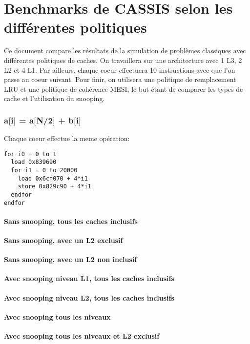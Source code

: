 \documentclass{article}
\begin{document}
\part*{Benchmarks de CASSIS selon les différentes politiques}
\indent Ce document compare les résultats de la simulation de problèmes classiques avec différentes politiques de caches. On travaillera sur une architecture avec 1 L3, 2 L2 et 4 L1. Par ailleurs, chaque coeur effectuera 10 instructions avec que l'on passe au coeur suivant. Pour finir, on utilisera une politique de remplacement LRU et une politique de cohérence MESI, le but étant de comparer les types de cache et l'utilisation du snooping.

\section{a[i] = a[N/2] + b[i]}
\indent Chaque coeur effectue la meme opération:
\begin{verbatim}
for i0 = 0 to 1
  load 0x839690
  for i1 = 0 to 20000
    load 0x6cf070 + 4*i1
    store 0x829c90 + 4*i1
  endfor
endfor
\end{verbatim}

\subsection*{Sans snooping, tous les caches inclusifs}

\subsection*{Sans snooping, avec un L2 exclusif}

\subsection*{Sans snooping, avec un L2 non inclusif}

\subsection*{Avec snooping niveau L1, tous les caches inclusifs}

\subsection*{Avec snooping niveau L2, tous les caches inclusifs}

\subsection*{Avec snooping tous les niveaux}

\subsection*{Avec snooping tous les niveaux et L2 exclusif}
\end{document}
